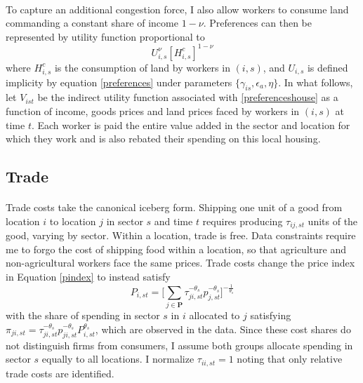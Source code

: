\documentclass[]{article}
\theoremstyle{plain}
\begin{document}
\paragraph*{}
To capture an additional congestion force, I also allow workers to consume land commanding a constant share of income $1-\nu$. Preferences can then be represented by utility function proportional to
\begin{equation}\label{preferenceshouse}
	U_{i,s}^{\nu}[H^{c}_{i,s}]^{1-\nu}
\end{equation} 
where $H^{c}_{i, s}$ is the consumption of land by workers in $(i, s)$, and $U_{i, s}$ is defined implicity by equation \eqref{preferences} under parameters $\{\gamma_{is}, \epsilon_{a}, \eta\}$. In what follows, let $V_{ist}$ be the indirect utility function associated with \eqref{preferenceshouse} as a function of income, goods prices and land prices faced by workers in $(i, s)$ at time $t$. Each worker is paid the entire value added in the sector and location for which they work and is also rebated their spending on this local housing.
\subsection*{Trade}
\paragraph*{}
Trade costs take the canonical iceberg form. Shipping one unit of a good from location $i$ to location $j$ in sector $s$ and time $t$ requires producing $\tau_{ij, st}$ units of the good, varying by sector. Within a location, trade is free. Data constraints require me to forgo the cost of shipping food within a location, so that agriculture and non-agricultural workers face the same prices. Trade costs change the price index in Equation \eqref{pindex} to instead satisfy
\begin{equation}\label{tradeprices}
	P_{i, st} = \bigg[\sum_{j \in \mathbf{P}}\tau_{ji,st}^{-\theta_{s}}p_{j, st}^{-\theta_{s}}\bigg]^{-\frac{1}{\theta_{s}}}
\end{equation}
with the share of spending in sector $s$ in $i$ allocated to $j$ satisfying $\pi_{ji, st} = \tau_{ji,st}^{-\theta_{s}}p_{ji, st}^{-\theta_{s}}P_{i,st}^{\theta_{s}}$, which are observed in the data. Since these cost shares do not distinguish firms from consumers, I assume both groups allocate spending in sector $s$ equally to all locations. I normalize $\tau_{ii, st} = 1$ noting that only relative trade costs are identified.
\end{document}
